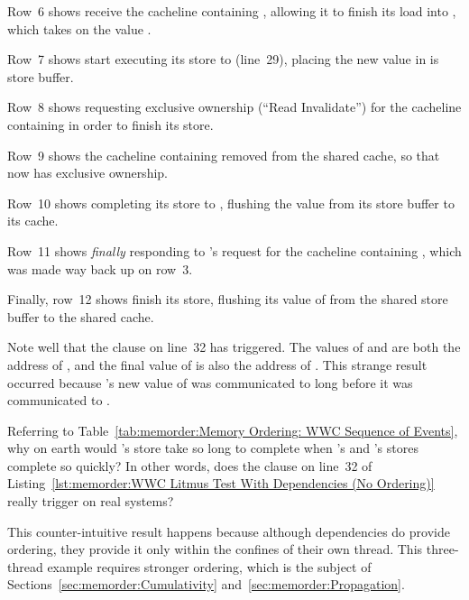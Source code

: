Row~6 shows  receive the cacheline containing , allowing
it to finish its load into , which takes on the value .

Row~7 shows  start executing its store to  (line~29), placing the
new value in is store buffer.

Row~8 shows  requesting exclusive ownership (``Read Invalidate'')
for the cacheline containing  in order to finish its store.

Row~9 shows the cacheline containing  removed from the shared cache,
so that  now has exclusive ownership.

Row~10 shows  completing its store to , flushing the value
from its store buffer to its cache.

Row~11 shows  \emph{finally} responding to 's request for
the cacheline containing , which was made way back up on row~3.

Finally, row~12 shows  finish its store, flushing its value of
 from the shared store buffer to the shared cache.

Note well that the  clause on line~32 has triggered.
The values of  and  are both the address of , and
the final value of  is also the address of .
This strange result occurred because 's new value of  was
communicated to  long before it was communicated to .

\QuickQuiz{}
	Referring to
	Table~\ref{tab:memorder:Memory Ordering: WWC Sequence of Events},
	why on earth would 's store take so long to complete when
	's and 's stores complete so quickly?
	In other words, does the  clause on line~32 of
	Listing~\ref{lst:memorder:WWC Litmus Test With Dependencies (No Ordering)}
	really trigger on real systems?
 \QuickQuizEnd

This counter-intuitive result happens because although dependencies
do provide ordering, they provide it only within the confines of their
own thread.
This three-thread example requires stronger ordering, which
is the subject of
Sections~\ref{sec:memorder:Cumulativity}
and~\ref{sec:memorder:Propagation}.

